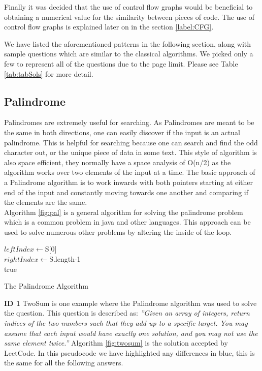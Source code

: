 \documentclass[10pt,twocolumn,hidelinks]{IEEEtran}
\begin{document}
\par Finally it was decided that the use of control flow graphs would be beneficial to obtaining a numerical value for the similarity between pieces of code. The use of control flow graphs is explained later on in the section \ref{label:CFG}.
\par We have listed the aforementioned patterns in the following section, along with sample questions which are similar to the classical algorithms. We picked only a few to represent all of the questions due to the page limit. Please see Table \ref{tab:tabSols} for more detail.
\subsection{Palindrome}
Palindromes are extremely useful for searching. As Palindromes are meant to be the same in both directions, one can easily discover if the input is an actual palindrome. This is helpful for searching because one can search and find the odd character out, or the unique piece of data in some text. This style of algorithm is also space efficient, they normally have a space analysis of O(n/2) as the algorithm works over two elements of the input at a time. The basic approach of a Palindrome algorithm is to work inwards with both pointers starting at either end of the input and constantly moving towards one another and comparing if the elements are the same.\\  
Algorithm \ref{fig:pal} is a general algorithm for solving the palindrome problem which is a common problem in java and other languages. This approach can be used to solve numerous other problems by altering the inside of the loop.
\IncMargin{1em}
\begin{algorithm}
	\LinesNumbered
	$leftIndex  \longleftarrow $S[0]\\
	$rightIndex \longleftarrow $S.length-1\\
\Return true
\caption{The Palindrome Algorithm}
\label{fig:pal}
\end{algorithm}\DecMargin{1em}
 \textbf{ID 1} TwoSum is one example where the Palindrome algorithm was used to solve the question. This question is described as: \textit{''Given an array of integers, return indices of the two numbers such that they add up to a specific target. You may assume that each input would have exactly one solution, and you may not use the same element twice.''} Algorithm \ref{fig:twosum} is the solution accepted by LeetCode. In this pseudocode we have highlighted any differences in blue, this is the same for all the following answers.
\end{document}
